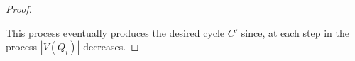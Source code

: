 \documentclass{patmorin}
\begin{document}
\begin{proof}
\begin{compactenum}
  \end{compactenum}
  This process eventually produces the desired cycle $C'$ since, at each step in the process $|V(Q_i)|$ decreases.
\end{proof}
\end{document}
